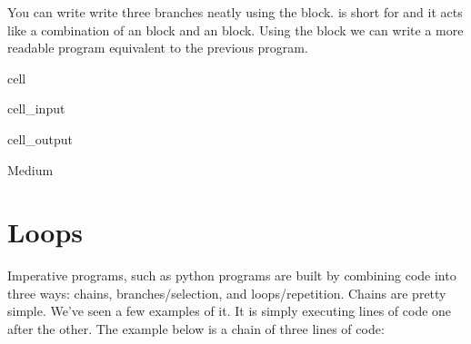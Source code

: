 \documentclass[letterpaper,10pt,english]{jupyterBook}
\begin{document}
\sphinxAtStartPar
You can write write three branches neatly using the  block.  is short for  and it acts like a combination of an  block and an  block. Using the  block we can write a more readable program equivalent to the previous program.

\begin{sphinxuseclass}{cell}\begin{sphinxVerbatimInput}

\begin{sphinxuseclass}{cell_input}
\begin{sphinxVerbatim}[commandchars=\\\{\}]
  
   
      
\end{sphinxVerbatim}

\end{sphinxuseclass}\end{sphinxVerbatimInput}
\begin{sphinxVerbatimOutput}

\begin{sphinxuseclass}{cell_output}
\begin{sphinxVerbatim}[commandchars=\\\{\}]
Medium
\end{sphinxVerbatim}

\end{sphinxuseclass}\end{sphinxVerbatimOutput}

\end{sphinxuseclass}
\sphinxstepscope


\chapter{Loops}
\label{\detokenize{loops:loops}}\label{\detokenize{loops::doc}}
\sphinxAtStartPar
Imperative programs, such as python programs are built by combining code into three ways: chains, branches/selection, and loops/repetition. Chains are pretty simple. We’ve seen a few examples of it. It is simply executing lines of code one after the other. The example below is a chain of three lines of code:
\end{document}
